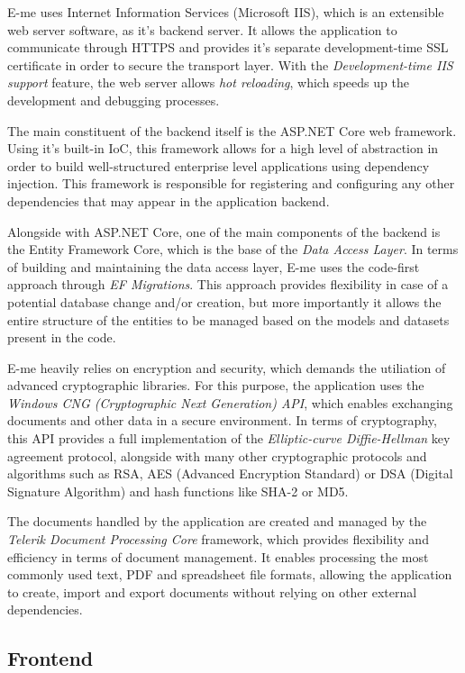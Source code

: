 E-me uses Internet Information Services (Microsoft IIS), which is an extensible web server software, as it's backend server.
It allows the application to communicate through HTTPS and provides it's separate development-time SSL certificate in order to secure the transport
layer. With the \emph{Development-time IIS support} feature, the web server allows \emph{hot reloading}, which speeds up the development and debugging
processes.

The main constituent of the backend itself is the ASP.NET Core web framework.
Using it's built-in IoC, this framework allows for a high level of abstraction in order to build well-structured enterprise level applications
using dependency injection.
This framework is responsible for registering and configuring any other dependencies that may appear in the application backend.

Alongside with ASP.NET Core, one of the main components of the backend is the Entity Framework Core, which is the base of the 
\emph{Data Access Layer}.
In terms of building and maintaining the data access layer, E-me uses the code-first approach through \emph{EF Migrations}.
This approach provides flexibility in case of a potential database change and/or creation, but more importantly it allows 
the entire structure of the entities to be managed based on the models and datasets present in the code.

E-me heavily relies on encryption and security, which demands the utiliation of advanced cryptographic libraries.
For this purpose, the application uses the \emph{Windows CNG (Cryptographic Next Generation) API}, which
enables exchanging documents and other data in a secure environment.
In terms of cryptography, this API provides a full implementation of the \emph{Elliptic-curve Diffie-Hellman} key agreement protocol,
alongside with many other cryptographic protocols and algorithms such as RSA, AES (Advanced Encryption Standard) or DSA (Digital Signature Algorithm)
and hash functions like SHA-2 or MD5.

The documents handled by the application are created and managed by the \emph{Telerik Document Processing Core} framework, which
provides flexibility and efficiency in terms of document management. 
It enables processing the most commonly used text, PDF and spreadsheet file formats, allowing the application
to create, import and export documents without relying on other external dependencies.

\subsection{Frontend}

